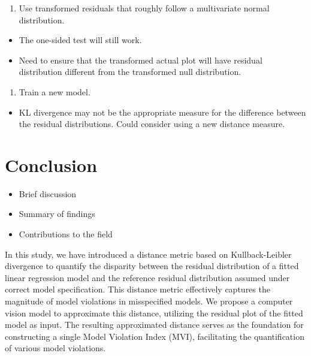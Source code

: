 \documentclass[]{interact}
\theoremstyle{plain}%
\theoremstyle{definition}
\theoremstyle{remark}
\providecommand{\tightlist}{%
  \setlength{\itemsep}{0pt}\setlength{\parskip}{0pt}}
\def\tightlist{}
\begin{document}
\begin{enumerate}
\def\labelenumi{\arabic{enumi}.}
\setcounter{enumi}{1}
\tightlist
\item
  Use transformed residuals that roughly follow a multivariate normal
  distribution.
\end{enumerate}

\begin{itemize}
\tightlist
\item
  The one-sided test will still work.
\item
  Need to ensure that the transformed actual plot will have residual
  distribution different from the transformed null distribution.
\end{itemize}

\begin{enumerate}
\def\labelenumi{\arabic{enumi}.}
\setcounter{enumi}{2}
\tightlist
\item
  Train a new model.
\end{enumerate}

\begin{itemize}
\tightlist
\item
  KL divergence may not be the appropriate measure for the difference
  between the residual distributions. Could consider using a new
  distance measure.
\end{itemize}

\section{Conclusion}\label{conclusion}

\begin{itemize}
\tightlist
\item
  Brief discussion
\item
  Summary of findings
\item
  Contributions to the field
\end{itemize}

In this study, we have introduced a distance metric based on
Kullback-Leibler divergence to quantify the disparity between the
residual distribution of a fitted linear regression model and the
reference residual distribution assumed under correct model
specification. This distance metric effectively captures the magnitude
of model violations in misspecified models. We propose a computer vision
model to approximate this distance, utilizing the residual plot of the
fitted model as input. The resulting approximated distance serves as the
foundation for constructing a single Model Violation Index (MVI),
facilitating the quantification of various model violations.
\end{document}
